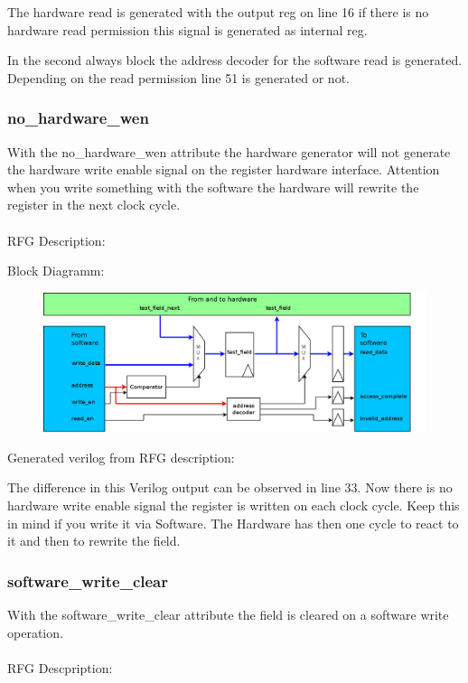 \documentclass[12pt,a4paper]{article}
\begin{document}
The hardware read is generated with the output reg on line 16 if there is no hardware read permission this signal is generated as internal reg.

In the second always block the address decoder for the software read is generated. Depending on the read permission line 51 is generated or not.

\newpage

\subsubsection{no\_hardware\_wen}

With the no\_hardware\_wen attribute the hardware generator will not generate the hardware write enable signal on the register hardware interface. Attention when you write something with the software the hardware will rewrite the register in the next clock cycle.\\
\\
RFG Description:


Block Diagramm:
\begin{figure}[h!]
\includegraphics[width=\textwidth]{pictures/Reg_hrw_srw_nhwen.png}
\end{figure}
\newpage
Generated verilog from RFG description:

The difference in this Verilog output can be observed in line 33. Now there is no hardware write enable signal the register is written on each clock cycle. Keep this in mind if you write it via Software. The Hardware has then one cycle to react to it and then to rewrite the field.
\newpage

\subsubsection{software\_write\_clear}
With the software\_write\_clear attribute the field is cleared on a software write operation.\\
\\
RFG Descpription:

\end{document}
